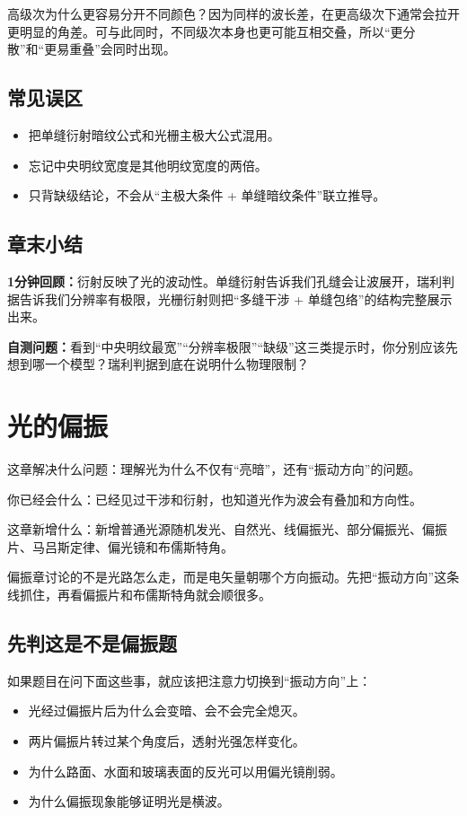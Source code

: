 \documentclass[lang=cn,11pt]{elegantbook}
\newcommand{\bridge}[1]{\begin{note}#1\end{note}}
\newcommand{\chapterroadmap}[3]{%
\begin{introduction}
  \item {\heiti 这章解决什么问题：}#1
  \item {\heiti 你已经会什么：}#2
  \item {\heiti 这章新增什么：}#3
\end{introduction}}
\newcommand{\summaryline}[1]{\par\noindent\textbf{1分钟回顾：}#1\par}
\newcommand{\chapterselfcheck}[1]{\par\noindent\textbf{自测问题：}#1\par}
\begin{document}
\begin{note}
高级次为什么更容易分开不同颜色？因为同样的波长差，在更高级次下通常会拉开更明显的角差。可与此同时，不同级次本身也更可能互相交叠，所以“更分散”和“更易重叠”会同时出现。
\end{note}

\section{常见误区}

\begin{itemize}
  \item 把单缝衍射暗纹公式和光栅主极大公式混用。
  \item 忘记中央明纹宽度是其他明纹宽度的两倍。
  \item 只背缺级结论，不会从“主极大条件 + 单缝暗纹条件”联立推导。
\end{itemize}

\section{章末小结}

\summaryline{衍射反映了光的波动性。单缝衍射告诉我们孔缝会让波展开，瑞利判据告诉我们分辨率有极限，光栅衍射则把“多缝干涉 + 单缝包络”的结构完整展示出来。}
\chapterselfcheck{看到“中央明纹最宽”“分辨率极限”“缺级”这三类提示时，你分别应该先想到哪一个模型？瑞利判据到底在说明什么物理限制？}

\chapter{光的偏振}

\chapterroadmap
{理解光为什么不仅有“亮暗”，还有“振动方向”的问题。}
{已经见过干涉和衍射，也知道光作为波会有叠加和方向性。}
{新增普通光源随机发光、自然光、线偏振光、部分偏振光、偏振片、马吕斯定律、偏光镜和布儒斯特角。}

\bridge{偏振章讨论的不是光路怎么走，而是电矢量朝哪个方向振动。先把“振动方向”这条线抓住，再看偏振片和布儒斯特角就会顺很多。}

\section{先判这是不是偏振题}

如果题目在问下面这些事，就应该把注意力切换到“振动方向”上：
\begin{itemize}
  \item 光经过偏振片后为什么会变暗、会不会完全熄灭。
  \item 两片偏振片转过某个角度后，透射光强怎样变化。
  \item 为什么路面、水面和玻璃表面的反光可以用偏光镜削弱。
  \item 为什么偏振现象能够证明光是横波。
\end{itemize}
\end{document}
